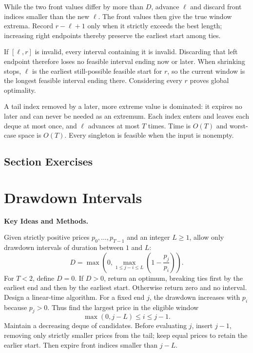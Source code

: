 While the two front values differ by more than $D$, advance $\ell$ and discard front indices smaller than the new $\ell$. The front values then give the true window extrema. Record $r-\ell+1$ only when it strictly exceeds the best length; increasing right endpoints thereby preserve the earliest start among ties.

If $[\ell,r]$ is invalid, every interval containing it is invalid. Discarding that left endpoint therefore loses no feasible interval ending now or later. When shrinking stops, $\ell$ is the earliest still-possible feasible start for $r$, so the current window is the longest feasible interval ending there. Considering every $r$ proves global optimality.

A tail index removed by a later, more extreme value is dominated: it expires no later and can never be needed as an extremum. Each index enters and leaves each deque at most once, and $\ell$ advances at most $T$ times. Time is $O(T)$ and worst-case space is $O(T)$. Every singleton is feasible when the input is nonempty.



\par{}
\subsection*{Section Exercises}



\section{Drawdown Intervals}
\noindent\textbf{Key Ideas and Methods.}\enspace


Given strictly positive prices $p_0,\ldots,p_{T-1}$ and an integer $L\ge1$, allow only drawdown intervals of duration between $1$ and $L$:
\[
D=\max\left(0,\max_{1\le j-i\le L}\left(1-\frac{p_j}{p_i}\right)\right).
\]
For $T<2$, define $D=0$. If $D>0$, return an optimum, breaking ties first by the earliest end and then by the earliest start. Otherwise return zero and no interval. Design a linear-time algorithm.
\solution For a fixed end $j$, the drawdown increases with $p_i$ because $p_j>0$. Thus find the largest price in the eligible window
\[
\max(0,j-L)\le i\le j-1.
\]
Maintain a decreasing deque of candidates. Before evaluating $j$, insert $j-1$, removing only strictly smaller prices from the tail; keep equal prices to retain the earlier start. Then expire front indices smaller than $j-L$.

